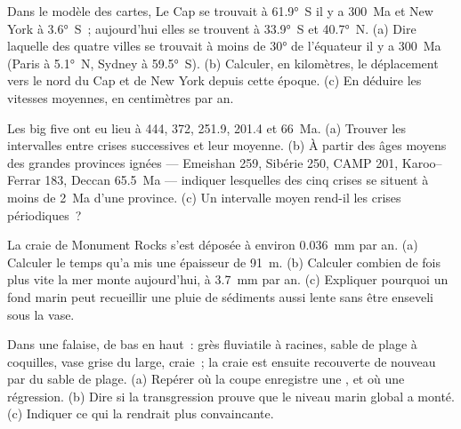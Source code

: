 \begin{exercise}[$\star$]\label{exo:b2:phanerozoic-earth:1}
Dans le modèle des cartes, Le Cap se trouvait à \ang{61.9}~S il y a \qty{300}{Ma} et New York à
\ang{3.6}~S~; aujourd'hui elles se trouvent à \ang{33.9}~S et \ang{40.7}~N. (a) Dire laquelle des
quatre villes se trouvait à moins de \ang{30} de l'équateur il y a \qty{300}{Ma} (Paris à
\ang{5.1}~N, Sydney à \ang{59.5}~S). (b) Calculer, en kilomètres, le déplacement vers le nord du Cap
et de New York depuis cette époque. (c) En déduire les vitesses moyennes, en centimètres par an.
\end{exercise}

\begin{exercise}[$\star$]\label{exo:b2:phanerozoic-earth:2}
Les big five ont eu lieu à 444, 372, 251.9, 201.4 et \qty{66}{Ma}. (a) Trouver les intervalles entre crises
successives et leur moyenne. (b) À partir des âges moyens des grandes provinces ignées --- Emeishan 259,
Sibérie 250, CAMP 201, Karoo--Ferrar 183, Deccan \qty{65.5}{Ma} --- indiquer lesquelles des cinq crises se
situent à moins de \qty{2}{Ma} d'une province. (c) Un intervalle moyen rend-il les crises périodiques~?
\end{exercise}

\begin{exercise}[$\star$]\label{exo:b2:phanerozoic-earth:3}
La craie de Monument Rocks s'est déposée à environ \qty{0.036}{mm} par an. (a) Calculer le temps qu'a mis une épaisseur
de \qty{91}{m}. (b) Calculer combien de fois plus vite la mer monte aujourd'hui, à \qty{3.7}{mm} par an. (c)
Expliquer pourquoi un fond marin peut recueillir une pluie de sédiments aussi lente sans être enseveli sous la vase.
\end{exercise}

\begin{exercise}[$\star$]\label{exo:b2:phanerozoic-earth:4}
Dans une falaise, de bas en haut~: grès fluviatile à racines, sable de plage à coquilles, vase grise
du large, craie~; la craie est ensuite recouverte de nouveau par du sable de plage. (a) Repérer
où la coupe enregistre une , et où une régression. (b) Dire si la transgression
prouve que le niveau marin global a monté. (c) Indiquer ce qui la rendrait plus convaincante.
\end{exercise}

